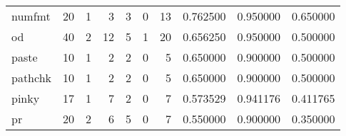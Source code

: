 \begin{tabular}{lrrrrrrrrr}
numfmt    &                                      20 &                                                  1 &                                                  3 &                                                  3 &                                                  0 &                                                 13 &                                           0.762500 &                               0.950000 &                             0.650000 \\
od        &                                      40 &                                                  2 &                                                 12 &                                                  5 &                                                  1 &                                                 20 &                                           0.656250 &                               0.950000 &                             0.500000 \\
paste     &                                      10 &                                                  1 &                                                  2 &                                                  2 &                                                  0 &                                                  5 &                                           0.650000 &                               0.900000 &                             0.500000 \\
pathchk   &                                      10 &                                                  1 &                                                  2 &                                                  2 &                                                  0 &                                                  5 &                                           0.650000 &                               0.900000 &                             0.500000 \\
pinky     &                                      17 &                                                  1 &                                                  7 &                                                  2 &                                                  0 &                                                  7 &                                           0.573529 &                               0.941176 &                             0.411765 \\
pr        &                                      20 &                                                  2 &                                                  6 &                                                  5 &                                                  0 &                                                  7 &                                           0.550000 &                               0.900000 &                             0.350000 \\

\end{tabular}
